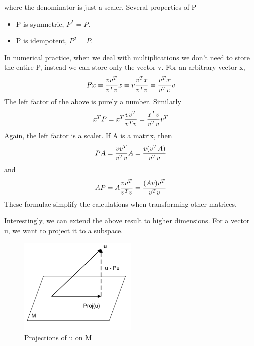 where the denominator is just a scaler. Several properties of P
\begin{itemize}
\item P is symmetric, \(P^T = P\).
\item P is idempotent, \(P^2 = P\).
\end{itemize}
In numerical practice, when we deal with multiplications we don't need to store the entire P, instead we can store only the vector v. For an arbitrary vector x, 
\[Px = {{vv^T} \over {v^Tv}}x = v{{v^Tx} \over {v^Tv}} = 
{{v^Tx} \over {v^Tv}}v\]
The left factor of the above is purely a number. Similarly
\[x^TP = x^T {{vv^T} \over {v^Tv}} = {{x^Tv} \over {v^Tv}} v^T\]
Again, the left factor is a scaler. If A is a matrix, then
\[PA = {{vv^T} \over {v^Tv}}A = {{v(v^TA)} \over {v^Tv}}\]
and
\[AP = A{{vv^T} \over {v^Tv}} = {{(Av)v^T} \over {v^Tv}}\]
These formulae simplify the calculations when transforming other matrices.

Interestingly, we can extend the above result to higher dimensions. For a vector u, we want to project it to a subspace.
\begin{figure}[htp]
\centerline{
\includegraphics[bb=20 0 200 185,width=0.5\textwidth] {chap4/projection2.png}
}
\caption{Projections of u on M}
\label{figure:projection2}
\end{figure}

